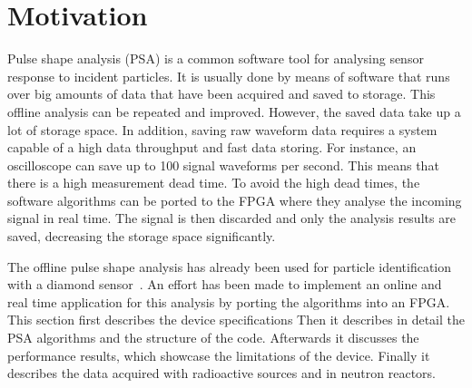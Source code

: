 

\section{Motivation}
\label{sec:rtpi}
Pulse shape analysis (PSA) is a common software tool for analysing sensor response to incident particles. It is usually done by means of software that runs over big amounts of data that have been acquired and saved to storage. This offline analysis can be repeated and improved. However, the saved data take up a lot of storage space. In addition, saving raw waveform data requires a system capable of a high data throughput and fast data storing. For instance, an oscilloscope can save up to 100 signal waveforms per second. This means that there is a high measurement dead time. To avoid the high dead times, the software algorithms can be ported to the FPGA where they analyse the incoming signal in real time. The signal is then discarded and only the analysis results are saved, decreasing the storage space significantly.

The offline pulse shape analysis has already been used for particle identification with a diamond sensor~\cite{PAVEL:00000, PAVEL:00002}. An effort has been made to implement an online and real time application for this analysis by porting the algorithms into an FPGA. This section first describes the device specifications Then it describes in detail the PSA algorithms and the structure of the code. Afterwards it discusses the performance results, which showcase the limitations of the device. Finally it describes the data acquired with radioactive sources and in neutron reactors.


